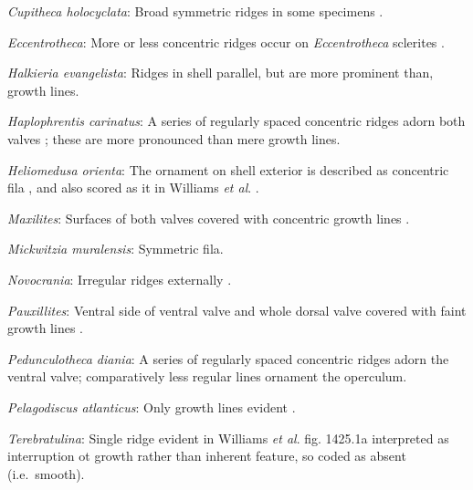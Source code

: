 \documentclass[openany]{book}
\begin{document}
\hypertarget{Cupitheca_holocyclata-coding-123}{}
\emph{Cupitheca holocyclata}: Broad symmetric ridges in some specimens
\citep{Vendrasco2017}.

\hypertarget{Eccentrotheca-coding-123}{}
\emph{Eccentrotheca}: More or less concentric ridges occur on
\emph{Eccentrotheca} sclerites
\citep{Skovsted2011Scleritomeconstruction}.

\hypertarget{Halkieria_evangelista-coding-123}{}
\emph{Halkieria evangelista}: Ridges in shell parallel, but are more
prominent than, growth lines.

\hypertarget{Haplophrentis_carinatus-coding-123}{}
\emph{Haplophrentis carinatus}: A series of regularly spaced concentric
ridges adorn both valves \citep{Moysiuk2017Hyolithsare}; these are more
pronounced than mere growth lines.

\hypertarget{Heliomedusa_orienta-coding-123}{}
\emph{Heliomedusa orienta}: The ornament on shell exterior is described
as concentric fila \citep[P.43]{Chen2007Reinterpretationof}, and also
scored as it in Williams \emph{et al}.
\citeyearpar[pp.160--163]{Williams2000LinguliformeaCraniiformea}.

\hypertarget{Maxilites-coding-123}{}
\emph{Maxilites}: Surfaces of both valves covered with concentric growth
lines \citep{Marek1972, MartiMus2005}.

\hypertarget{Mickwitzia_muralensis-coding-123}{}
\emph{Mickwitzia muralensis}: Symmetric fila.

\hypertarget{Novocrania-coding-123}{}
\emph{Novocrania}: Irregular ridges externally
\citep{Williams2000LinguliformeaCraniiformea}.

\hypertarget{Pauxillites-coding-123}{}
\emph{Pauxillites}: Ventral side of ventral valve and whole dorsal valve
covered with faint growth lines \citep{Valent2015}.

\hypertarget{Pedunculotheca_diania-coding-123}{}
\emph{Pedunculotheca diania}: A series of regularly spaced concentric
ridges adorn the ventral valve; comparatively less regular lines
ornament the operculum.

\hypertarget{Pelagodiscus_atlanticus-coding-123}{}
\emph{Pelagodiscus atlanticus}: Only growth lines evident
\citep{Williams2000LinguliformeaCraniiformea}.

\hypertarget{Terebratulina-coding-123}{}
\emph{Terebratulina}: Single ridge evident in Williams \emph{et al}.
\citeyearpar{Williams2006Rhynchonelliformeapart} fig. 1425.1a
interpreted as interruption ot growth rather than inherent feature, so
coded as absent (i.e.~smooth).
\end{document}
